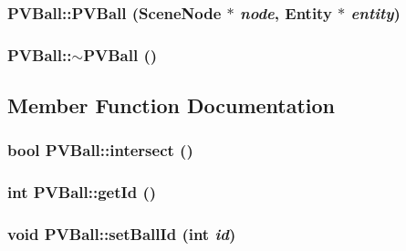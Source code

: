 \subsubsection[{PVBall}]{\setlength{\rightskip}{0pt plus 5cm}PVBall::PVBall (SceneNode $\ast$ {\em node}, \/  Entity $\ast$ {\em entity})}\label{class_p_v_ball_12ef7c87d000beae278975193872de49}


\subsubsection[{$\sim$PVBall}]{\setlength{\rightskip}{0pt plus 5cm}PVBall::$\sim$PVBall ()\hspace{0.3cm}{\tt  [virtual]}}\label{class_p_v_ball_a00806c0b3ea8703fd8f3882baa75a7d}




\subsection{Member Function Documentation}
\subsubsection[{intersect}]{\setlength{\rightskip}{0pt plus 5cm}bool PVBall::intersect ()}\label{class_p_v_ball_f9a225f53d94a8bf804e260d10ec34ee}


\subsubsection[{getId}]{\setlength{\rightskip}{0pt plus 5cm}int PVBall::getId ()}\label{class_p_v_ball_ba4d460f5a7d8e3741e9ab2f438157ca}


\subsubsection[{setBallId}]{\setlength{\rightskip}{0pt plus 5cm}void PVBall::setBallId (int {\em id})}\label{class_p_v_ball_5302c6790e1ac845b98c93b44d2dc5e4}


